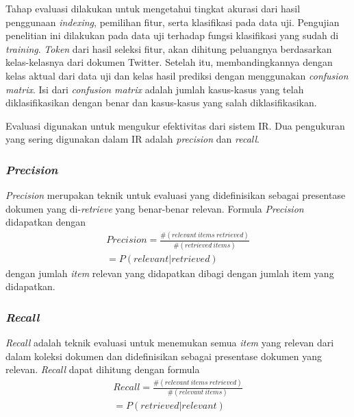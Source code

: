 Tahap evaluasi dilakukan untuk mengetahui tingkat akurasi dari hasil penggunaan \textit{indexing}, pemilihan fitur, serta klasifikasi pada data uji. Pengujian penelitian ini dilakukan pada data uji terhadap fungsi klasifikasi yang sudah di \textit{training}. \textit{Token} dari hasil seleksi fitur, akan dihitung peluangnya berdasarkan kelas-kelasnya dari dokumen Twitter. Setelah itu, membandingkannya dengan kelas aktual dari data uji dan kelas hasil prediksi dengan menggunakan \textit{confusion matrix}. Isi dari \textit{confusion matrix} adalah jumlah kasus-kasus yang telah diklasifikasikan dengan benar dan kasus-kasus yang salah diklasifikasikan.

Evaluasi digunakan untuk mengukur efektivitas dari sistem IR. Dua pengukuran yang sering digunakan dalam IR adalah \textit{precision} dan \textit{recall}.

\subsubsection*{\textit{Precision}}
\textit{Precision} merupakan teknik untuk evaluasi yang didefinisikan sebagai presentase dokumen yang di-\textit{retrieve} yang benar-benar relevan. Formula \textit{Precision} didapatkan dengan
\begin{equation}
\begin{split}
Precision = \frac{\#(relevant\: items\: retrieved)}{\#(retrieved\:  items)} \\ 
= P(relevant|retrieved)
\label{eq:precision}
\end{split}
\end{equation}
dengan jumlah \textit{item} relevan yang didapatkan dibagi dengan jumlah item yang didapatkan.

\subsubsection*{\textit{Recall}}
\textit{Recall} adalah teknik evaluasi untuk menemukan semua \textit{item} yang relevan dari dalam koleksi dokumen dan didefinisikan sebagai presentase dokumen yang relevan. \textit{Recall} dapat dihitung dengan formula
\begin{equation}
\begin{split}
Recall = \frac{\#(relevant\: items\: retrieved)}{\#(relevant\: items)} \\ 
= P(retrieved|relevant)
\label{eq:recall}
\end{split}
\end{equation}

